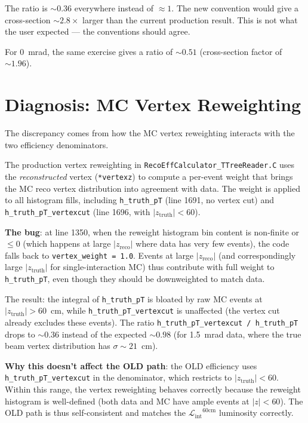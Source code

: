 \documentclass[11pt,letterpaper]{article}
\newcommand{\Lint}{\ensuremath{\mathcal{L}_{\text{int}}}}
\begin{document}
The ratio is $\sim 0.36$ everywhere instead of $\approx 1$. The new
convention would give a cross-section $\sim 2.8\times$ larger than the
current production result. This is not what the user expected ---
the conventions should agree.

For 0~mrad, the same exercise gives a ratio of $\sim 0.51$ (cross-section
factor of $\sim 1.96$).

\section{Diagnosis: MC Vertex Reweighting}
\label{sec:diagnosis}

The discrepancy comes from how the MC vertex reweighting interacts with
the two efficiency denominators.

The production vertex reweighting in
\texttt{RecoEffCalculator\_TTreeReader.C} uses the \emph{reconstructed}
vertex (\texttt{*vertexz}) to compute a per-event weight that brings the
MC reco vertex distribution into agreement with data. The weight is
applied to all histogram fills, including \texttt{h\_truth\_pT} (line
1691, no vertex cut) and \texttt{h\_truth\_pT\_vertexcut} (line 1696,
with $|z_{\text{truth}}|<60$).

\textbf{The bug}: at line 1350, when the reweight histogram bin content
is non-finite or $\leq 0$ (which happens at large $|z_{\text{reco}}|$
where data has very few events), the code falls back to
\texttt{vertex\_weight = 1.0}. Events at large $|z_{\text{reco}}|$
(and correspondingly large $|z_{\text{truth}}|$ for single-interaction
MC) thus contribute with full weight to \texttt{h\_truth\_pT}, even though
they should be downweighted to match data.

The result: the integral of \texttt{h\_truth\_pT} is bloated by raw MC
events at $|z_{\text{truth}}| > 60$~cm, while
\texttt{h\_truth\_pT\_vertexcut} is unaffected (the vertex cut already
excludes these events). The ratio
\texttt{h\_truth\_pT\_vertexcut / h\_truth\_pT} drops to $\sim 0.36$
instead of the expected $\sim 0.98$ (for 1.5~mrad data, where the
true beam vertex distribution has $\sigma \sim 21$~cm).

\textbf{Why this doesn't affect the OLD path}: the OLD efficiency uses
\texttt{h\_truth\_pT\_vertexcut} in the denominator, which restricts to
$|z_{\text{truth}}|<60$. Within this range, the vertex reweighting
behaves correctly because the reweight histogram is well-defined
(both data and MC have ample events at $|z|<60$). The OLD path is
thus self-consistent and matches the
$\Lint^{60\text{cm}}$ luminosity correctly.
\end{document}
